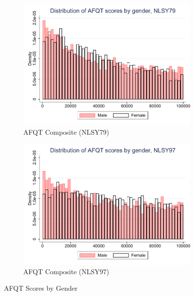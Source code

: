 \documentclass[onehalfspacing,11pt]{article}
\begin{document}
	\begin{figure}
		\begin{subfigure}{0.49\textwidth}
			\includegraphics[width=\linewidth]{NLSY79_afqt79_gender.pdf}
			\caption{AFQT Composite (NLSY79)} \label{fig:nlsy79math}
		\end{subfigure}
		\hspace*{\fill} %
		\begin{subfigure}{0.49\textwidth}
			\includegraphics[width=\linewidth]{NLSY97_afqt97_gender.pdf}
			\caption{AFQT Composite (NLSY97)} \label{fig:nlsy79word}
		\end{subfigure}
		\caption{AFQT Scores by Gender}
		\label{fig:nlsy_comp_by_gender}
	\end{figure}
	
\end{document}
